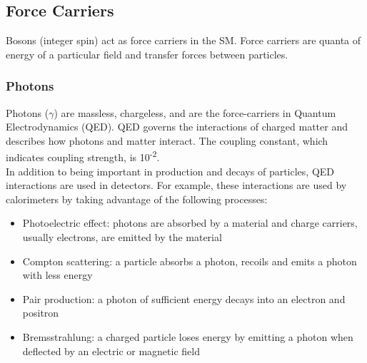 
		
	
	
\subsection{Force Carriers}

Bosons (integer spin) act as force carriers in the SM.  Force carriers are quanta of energy of a particular field and transfer forces between particles. \\ %



	\subsubsection{Photons}
	
	Photons ($\gamma$) are massless, chargeless, and are the force-carriers in Quantum Electrodynamics (QED).  QED governs the interactions of charged matter and describes how photons and matter interact.  The coupling constant, which indicates coupling strength, is 10\textsuperscript{-2}.\\
	
	In addition to being important in production and decays of particles, QED interactions are used in detectors.  For example, these interactions are used by calorimeters by taking advantage of the following processes:
	
	\begin{itemize}
		\item Photoelectric effect: photons are absorbed by a material and charge carriers, usually electrons, are emitted by the material
		\item Compton scattering: a particle absorbs a photon, recoils and emits a photon with less energy
		\item Pair production: a photon of sufficient energy decays into an electron and positron
		\item Bremsstrahlung: a charged particle loses energy by emitting a photon when deflected by an electric or magnetic field
	\end{itemize}
	
